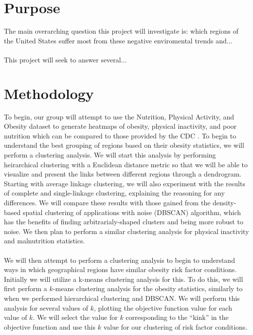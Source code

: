 \documentclass{article}
\begin{document}
\section{Purpose}
\label{purpose}
The main overarching question this project will investigate is: which regions of the United States suffer most from these negative enviromental trends and...
\\\\
This project will seek to answer several...

\section{Methodology}
\label{methodology}
To begin, our group will attempt to use the Nutrition, Physical Activity, and Obesity dataset to generate heatmaps of obesity, physical inactivity, and poor nutrition which can be compared to those provided by the CDC \cite{adultobesitymaps}. 
To begin to understand the best grouping of regions based on their obesity statistics, we will perform a clustering analysis. 
We will start this analysis by performing heirarchical clustering with a Euclidean distance metric so that we will be able to visualize and present the links between different regions through a dendrogram. 
Starting with average linkage clustering, we will also experiment with the results of complete and single-linkage clustering, explaining the reasoning for any differences. 
We will compare these results with those gained from the density-based spatial clustering of applications with noise (DBSCAN) algorithm, which has the benefits of finding arbitrarialy-shaped clusters and being more robust to noise. 
We then plan to perform a similar clustering analysis for physical inactivity and malnutrition statistics.
\\\\
We will then attempt to perform a clustering analysis to begin to understand ways in which geographical regions have similar obesity risk factor conditions. 
Initially we will utilize a k-means clustering analysis for this. To do this, we will first perform a $k$-means clustering analysis for the obesity statistics, similarly to when we performed hierarchical clustering and DBSCAN. 
We will perform this analysis for several values of $k$, plotting the objective function value for each value of $k$. We will select the value for $k$ corresponding to the “kink” in the objective function and use this $k$ value for our clustering of risk factor conditions. 
\end{document}
